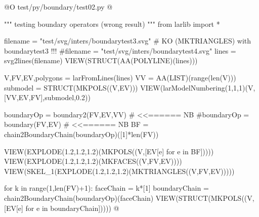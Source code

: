 \documentclass[11pt,oneside]{article}	%
\begin{document}
@O test/py/boundary/test02.py
@{""" testing boundary operators (wrong result) """
from larlib import *

filename = "test/svg/inters/boundarytest3.svg" # KO (MKTRIANGLES) with boundarytest3 !!!
#filename = "test/svg/inters/boundarytest4.svg"
lines = svg2lines(filename)
VIEW(STRUCT(AA(POLYLINE)(lines)))
    
V,FV,EV,polygons = larFromLines(lines)
VV = AA(LIST)(range(len(V)))
submodel = STRUCT(MKPOLS((V,EV)))
VIEW(larModelNumbering(1,1,1)(V,[VV,EV,FV],submodel,0.2))

boundaryOp = boundary2(FV,EV,VV)  # <<======  NB
#boundaryOp = boundary(FV,EV)  # <<======  NB
BF = chain2BoundaryChain(boundaryOp)([1]*len(FV))

VIEW(EXPLODE(1.2,1.2,1.2)(MKPOLS((V,[EV[e] for e in BF])))) 
VIEW(EXPLODE(1.2,1.2,1.2)(MKFACES((V,FV,EV)))) 
VIEW(SKEL_1(EXPLODE(1.2,1.2,1.2)(MKTRIANGLES((V,FV,EV))))) 

for k in range(1,len(FV)+1):
    faceChain = k*[1]
    boundaryChain = chain2BoundaryChain(boundaryOp)(faceChain)
    VIEW(STRUCT(MKPOLS((V,[EV[e] for e in boundaryChain]))))
@}
\end{document}

